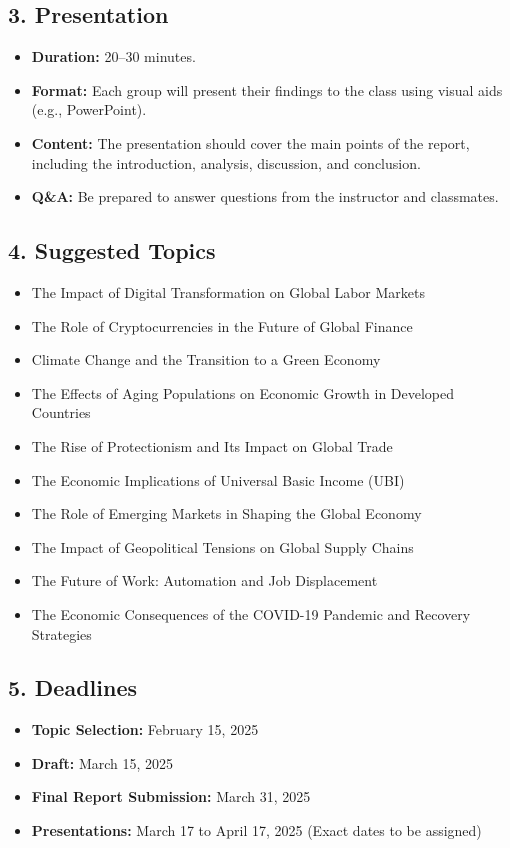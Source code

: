 \documentclass[12pt]{article}
\begin{document}
\subsection*{3. Presentation}
\begin{itemize}
    \item \textbf{Duration:} 20--30 minutes.
    \item \textbf{Format:} Each group will present their findings to the class using visual aids (e.g., PowerPoint).
    \item \textbf{Content:} The presentation should cover the main points of the report, including the introduction, analysis, discussion, and conclusion.
    \item \textbf{Q\&A:} Be prepared to answer questions from the instructor and classmates.
\end{itemize}

\subsection*{4. Suggested Topics}
\begin{itemize}
    \item The Impact of Digital Transformation on Global Labor Markets
    \item The Role of Cryptocurrencies in the Future of Global Finance
    \item Climate Change and the Transition to a Green Economy
    \item The Effects of Aging Populations on Economic Growth in Developed Countries
    \item The Rise of Protectionism and Its Impact on Global Trade
    \item The Economic Implications of Universal Basic Income (UBI)
    \item The Role of Emerging Markets in Shaping the Global Economy
    \item The Impact of Geopolitical Tensions on Global Supply Chains
    \item The Future of Work: Automation and Job Displacement
    \item The Economic Consequences of the COVID-19 Pandemic and Recovery Strategies
\end{itemize}

\subsection*{5. Deadlines}
\begin{itemize}
    \item \textbf{Topic Selection:} February 15, 2025

    \item \textbf{Draft:} March 15,  2025
    \item \textbf{Final Report Submission:} March 31, 2025
    \item \textbf{Presentations:} March 17 to April 17,  2025 (Exact dates to be assigned)
\end{itemize}
\end{document}
